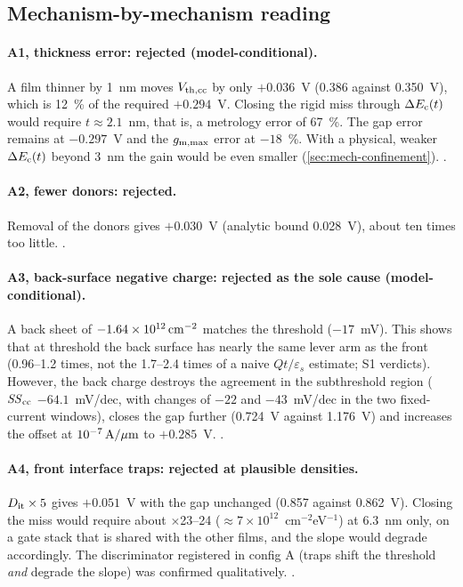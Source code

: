 \subsection{Mechanism-by-mechanism reading}
\paragraph{A1, thickness error: rejected (model-conditional).} A film thinner by 1~nm moves $V_{\mathrm{th,cc}}$ by only $+0.036$~V (0.386 against 0.350~V), which is 12~\% of the required $+0.294$~V. Closing the rigid miss through $\Delta E_{\mathrm{c}}(t)$ would require $t\approx2.1$~nm, that is, a metrology error of 67~\%. The gap error remains at $-0.297$~V and the $g_{\mathrm{m,max}}$ error at $-18$~\%. With a physical, weaker $\Delta E_{\mathrm{c}}(t)$ beyond 3~nm the gain would be even smaller (\cref{sec:mech-confinement}). \evNUM.

\paragraph{A2, fewer donors: rejected.} Removal of the donors gives $+0.030$~V (analytic bound 0.028~V), about ten times too little. \evNUM.

\paragraph{A3, back-surface negative charge: rejected as the sole cause (model-conditional).} A back sheet of $-1.64\times10^{12}\,\mathrm{cm}^{-2}$ matches the threshold ($-17$~mV). This shows that at threshold the back surface has nearly the same lever arm as the front (0.96--1.2 times, not the 1.7--2.4 times of a naive $Q t/\varepsilon_s$ estimate; S1 verdicts). However, the back charge destroys the agreement in the subthreshold region ($\mathit{SS}_{\mathrm{cc}}$ $-64.1$~mV/dec, with changes of $-22$ and $-43$~mV/dec in the two fixed-current windows), closes the gap further (0.724~V against 1.176~V) and increases the offset at $10^{-7}\,\mathrm{A}/\mu\mathrm{m}$ to $+0.285$~V. \evNUM.

\paragraph{A4, front interface traps: rejected at plausible densities.} $D_{\mathrm{it}}\times5$ gives $+0.051$~V with the gap unchanged (0.857 against 0.862~V). Closing the miss would require about $\times$23--24 ($\approx7\times10^{12}$~cm$^{-2}$eV$^{-1}$) at 6.3~nm only, on a gate stack that is shared with the other films, and the slope would degrade accordingly. The discriminator registered in config A (traps shift the threshold \emph{and} degrade the slope) was confirmed qualitatively. \evNUM.

